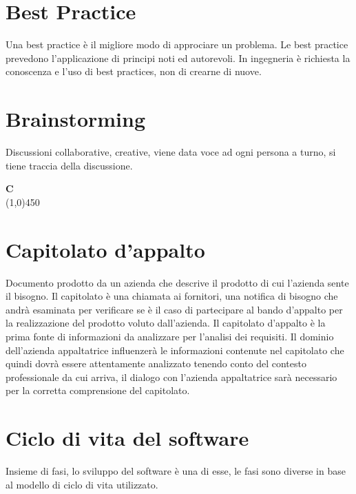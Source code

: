	\section{Best Practice}
	\label{sec:bestpractice}
	Una best practice è il migliore modo di approciare un problema. Le best practice prevedono l'applicazione di principi noti ed autorevoli. In ingegneria è richiesta la conoscenza e l'uso di best practices, non di crearne di nuove.

	\section{Brainstorming}
	\label{sec:brainstorming}
	Discussioni collaborative, creative, viene data voce ad ogni persona a turno, si tiene traccia della discussione. \newpage


	{\Huge{\textbf{C}}} \\
	\line(1,0){450}

	\section{Capitolato d'appalto}
	\label{sec:capitolato}
	Documento prodotto da un azienda che descrive il prodotto di cui l'azienda sente il bisogno. Il capitolato è una chiamata ai fornitori, una notifica di bisogno che andrà esaminata per verificare se è il caso di partecipare al bando d'appalto per la realizzazione del prodotto voluto dall'azienda. Il capitolato d'appalto è la prima fonte di informazioni da analizzare per l'analisi dei requisiti. Il dominio dell'azienda appaltatrice influenzerà le informazioni contenute nel capitolato che quindi dovrà essere attentamente analizzato tenendo conto del contesto professionale da cui arriva, il dialogo con l'azienda appaltatrice sarà necessario per la corretta comprensione del capitolato. 
	
	\section{Ciclo di vita del software}
	\label{sec:ciclodivita}
	Insieme di fasi, lo sviluppo del software è una di esse, le fasi sono diverse in base al modello di ciclo di vita utilizzato.


